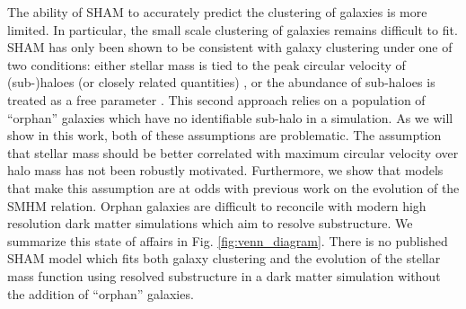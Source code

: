 \documentclass[useAMS,fleqn,usenatbib]{mnras}
\begin{document}
The ability of SHAM to accurately predict the clustering of galaxies is more limited.  In particular, the small scale clustering of galaxies remains difficult to fit.  SHAM has only been shown to be consistent with galaxy clustering under one of two conditions: either stellar mass is tied to the peak circular velocity of (sub-)haloes (or closely related quantities) \citep{Reddick:2013gi, Hearin:2014hh, Lehmann:2017fy}, or the abundance of sub-haloes is treated as a free parameter \citep{Wang:2006fe, Wang:2010ho, Guo:2010do, Moster:2010ep, Yang:2012ew}.  This second approach relies on a population of ``orphan'' galaxies which have no identifiable sub-halo in a simulation.  As we will show in this work, both of these assumptions are problematic.  The assumption that stellar mass should be better correlated with maximum circular velocity over halo mass has not been robustly motivated.  Furthermore, we show that models that make this assumption are at odds with previous work on the evolution of the SMHM relation.  Orphan galaxies are difficult to reconcile with modern high resolution dark matter simulations which aim to resolve substructure.  We summarize this state of affairs in Fig. \ref{fig:venn_diagram}.  There is no published SHAM model which fits both galaxy clustering and the evolution of the stellar mass function using resolved substructure in a dark matter simulation without the addition of ``orphan'' galaxies.
\end{document}
